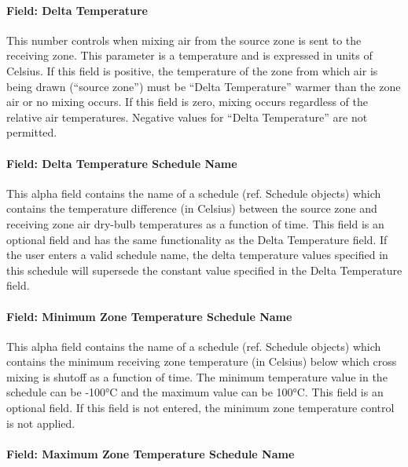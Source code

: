 \paragraph{Field: Delta Temperature}\label{field-delta-temperature-3}

This number controls when mixing air from the source zone is sent to the receiving zone. This parameter is a temperature and is expressed in units of Celsius. If this field is positive, the temperature of the zone from which air is being drawn (``source zone'') must be ``Delta Temperature'' warmer than the zone air or no mixing occurs. If this field is zero, mixing occurs regardless of the relative air temperatures. Negative values for ``Delta Temperature'' are not permitted.

\paragraph{Field: Delta Temperature Schedule Name}\label{field-delta-temperature-schedule-name-3}

This alpha field contains the name of a schedule (ref. Schedule objects) which contains the temperature difference (in Celsius) between the source zone and receiving zone air dry-bulb temperatures as a function of time. This field is an optional field and has the same functionality as the Delta Temperature field. If the user enters a valid schedule name, the delta temperature values specified in this schedule will supersede the constant value specified in the Delta Temperature field.

\paragraph{Field: Minimum Zone Temperature Schedule Name}\label{field-minimum-zone-temperature-schedule-name-1}

This alpha field contains the name of a schedule (ref. Schedule objects) which contains the minimum receiving zone temperature (in Celsius) below which cross mixing is shutoff as a function of time. The minimum temperature value in the schedule can be -100°C and the maximum value can be 100°C. This field is an optional field. If this field is not entered, the minimum zone temperature control is not applied.

\paragraph{Field: Maximum Zone Temperature Schedule Name}\label{field-maximum-zone-temperature-schedule-name-1}

